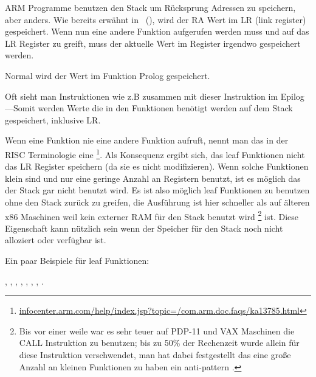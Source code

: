 

ARM Programme benutzen den Stack um Rücksprung Adressen zu speichern, aber anders.
Wie bereits erwähnt in \q{\HelloWorldSectionName}~(),
wird der \ac{RA} Wert im \ac{LR} (\gls{link register}) gespeichert.
Wenn nun eine andere Funktion aufgerufen werden muss und auf das \ac{LR} Register 
zu greift, muss der aktuelle Wert im Register irgendwo gespeichert werden.

Normal wird der Wert im Funktion Prolog gespeichert.


Oft sieht man Instruktionen wie z.B  zusammen mit dieser Instruktion im 
Epilog ---Somit werden Werte die in den Funktionen benötigt werden auf dem 
Stack gespeichert, inklusive \ac{LR}.

Wenn eine Funktion nie eine andere Funktion aufruft, nennt man das in der \ac{RISC} Terminologie eine
\emph{}\footnote{\href{http://go.yurichev.com/17064}{infocenter.arm.com/help/index.jsp?topic=/com.arm.doc.faqs/ka13785.html}}.  %
Als Konsequenz ergibt sich, das leaf Funktionen nicht das \ac{LR} Register speichern (da sie es nicht modifizieren).
Wenn solche Funktionen klein sind und nur eine geringe Anzahl an Registern benutzt, ist es möglich das der Stack
gar nicht benutzt wird. Es ist also möglich leaf Funktionen zu benutzen ohne den Stack zurück zu greifen, die Ausführung
ist hier schneller als auf älteren x86 Maschinen weil kein externer RAM für den Stack benutzt wird 
\footnote{Bis vor einer weile war es sehr teuer auf PDP-11 und VAX Maschinen die CALL Instruktion zu benutzen; bis zu 50\%
der Rechenzeit wurde allein für diese Instruktion verschwendet, man hat dabei festgestellt das eine große Anzahl an kleinen
Funktionen zu haben ein \gls{anti-pattern} .} ist.
Diese Eigenschaft kann nützlich sein wenn der Speicher für den Stack noch nicht alloziert oder verfügbar ist.

Ein paar Beispiele für leaf Funktionen:

, , 
, , ,
, , .

